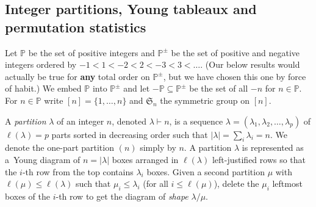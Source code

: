 \documentclass[revision]{FPSAC2024}
\newcommand{\la}{\lambda}
\newcommand{\PP}{\mathbb{P}} %
\begin{document}
\subsection{Integer partitions, Young tableaux and permutation statistics}

Let $\PP$ be the set of positive integers and $\PP^{\pm}$ be the set of positive and negative integers ordered by $-1<1<-2<2<-3<3<\dots$. (Our below results would actually be true for \textbf{any} total order on $\PP^{\pm}$, but we have chosen this one by force of habit.)
We embed $\PP$ into $\PP^{\pm}$ and let $-\PP \subseteq \PP^{\pm}$ be the set of all $-n$ for $n \in \PP$. For $n \in \PP$ write $[n] = \{1,\dots, n\}$ and $\mathfrak{S}_n$ the symmetric group on $[n]$.

A \emph{partition} $\la$ of an integer $n$, denoted $\la \vdash n$, is a sequence $\la=(\la_1,\la_2,\dots,\la_p)$ of $\ell(\la)=p$ parts sorted in decreasing order such that $|\la| = \sum_i{\la_i} = n$. We denote the one-part partition $(n)$ simply by $n$. A partition $\la$ is represented as a~Young diagram of $n=|\la|$ boxes arranged in $\ell(\la)$ left-justified rows so that the $i$-th row from the top contains $\la_i$ boxes. Given a second partition $\mu$ with $\ell(\mu) \leq \ell(\la)$ such that $\mu_i \leq \la_i$ (for all $i \leq \ell(\mu)$), delete the $\mu_i$ leftmost boxes of the $i$-th row to get the diagram of \emph{shape} $\la/\mu$.
\end{document}
